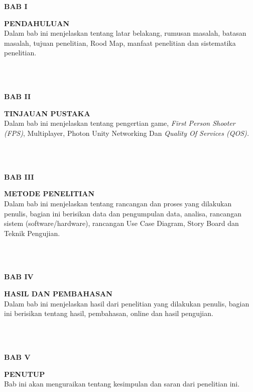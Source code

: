 \vspace*{1cm}
\noindent\begin{minipage}[t]{0.2\linewidth}
	\noindent \textbf{BAB I}
\end{minipage}
\begin{minipage}[t]{0.8\linewidth}
  \noindent
  \textbf{PENDAHULUAN}\\
  Dalam bab ini menjelaskan tentang latar belakang, rumusan 
  masalah, batasan masalah, tujuan penelitian, Rood Map, manfaat 
  penelitian dan sistematika penelitian.
\end{minipage}
\\
\\
\begin{minipage}[t]{0.2\linewidth}
	\noindent \textbf{BAB II}
\end{minipage}
\begin{minipage}[t]{0.8\linewidth}
  \noindent
  \textbf{TINJAUAN PUSTAKA}\\
  Dalam bab ini menjelaskan tentang pengertian game, \textit{First Person Shooter (FPS)}, Multiplayer, Photon Unity Networking Dan \emph{Quality Of Services (QOS).}
\end{minipage}
\\
\\
\begin{minipage}[t]{0.2\linewidth}
	\noindent \textbf{BAB III}
\end{minipage}
\begin{minipage}[t]{0.8\linewidth}
  \noindent
  \textbf{METODE PENELITIAN}\\
  Dalam bab ini menjelaskan tentang rancangan dan proses yang 
  dilakukan penulis, bagian ini berisikan data dan pengumpulan data, 
  analisa, rancangan sistem (software/hardware), rancangan Use Case 
  Diagram, Story Board dan Teknik Pengujian.
\end{minipage}
\\
\\
\begin{minipage}[t]{0.2\linewidth}
	\noindent \textbf{BAB IV}
\end{minipage}
\begin{minipage}[t]{0.8\linewidth}
  \noindent
  \textbf{HASIL DAN PEMBAHASAN}\\
  Dalam bab ini menjelaskan hasil dari penelitian yang dilakukan 
  penulis, bagian ini berisikan tentang hasil, pembahasan, online dan 
  hasil pengujian.
\end{minipage}
\\
\\
\begin{minipage}[t]{0.2\linewidth}
	\noindent \textbf{BAB V}
\end{minipage}
\begin{minipage}[t]{0.8\linewidth}
  \noindent
  \textbf{PENUTUP}\\
  Bab ini akan menguraikan tentang kesimpulan dan saran dari 
penelitian ini.
\end{minipage}


